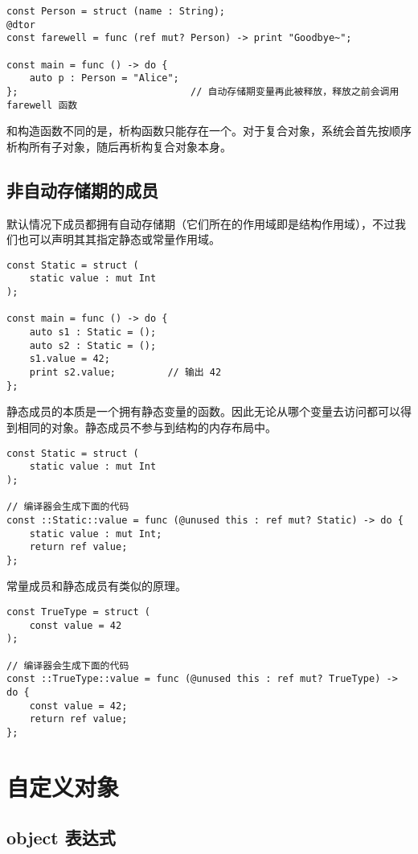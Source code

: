 \begin{lstlisting}
const Person = struct (name : String);
@dtor
const farewell = func (ref mut? Person) -> print "Goodbye~";

const main = func () -> do {
	auto p : Person = "Alice";
};								// 自动存储期变量再此被释放，释放之前会调用 farewell 函数
\end{lstlisting}

和构造函数不同的是，析构函数只能存在一个。对于复合对象，系统会首先按顺序析构所有子对象，随后再析构复合对象本身。

\subsection{非自动存储期的成员}

默认情况下成员都拥有自动存储期（它们所在的作用域即是结构作用域），不过我们也可以声明其其指定静态或常量作用域。

\begin{lstlisting}
const Static = struct (
	static value : mut Int
);

const main = func () -> do {
	auto s1 : Static = ();
	auto s2 : Static = ();
	s1.value = 42;
	print s2.value;			// 输出 42
};
\end{lstlisting}

静态成员的本质是一个拥有静态变量的函数。因此无论从哪个变量去访问都可以得到相同的对象。静态成员不参与到结构的内存布局中。

\begin{lstlisting}
const Static = struct (
	static value : mut Int
);

// 编译器会生成下面的代码
const ::Static::value = func (@unused this : ref mut? Static) -> do {
	static value : mut Int;
	return ref value;
};
\end{lstlisting}

常量成员和静态成员有类似的原理。

\begin{lstlisting}
const TrueType = struct (
	const value = 42
);

// 编译器会生成下面的代码
const ::TrueType::value = func (@unused this : ref mut? TrueType) -> do {
	const value = 42;
	return ref value;
};
\end{lstlisting}

\section{自定义对象}

\subsection{object 表达式}

